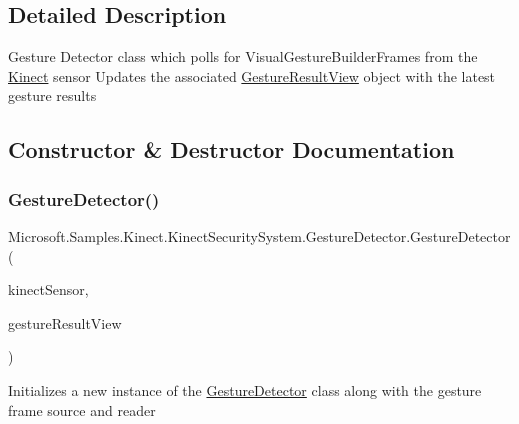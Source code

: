 \subsection{Detailed Description}
Gesture Detector class which polls for Visual\+Gesture\+Builder\+Frames from the \hyperlink{namespace_microsoft_1_1_samples_1_1_kinect}{Kinect} sensor Updates the associated \hyperlink{class_microsoft_1_1_samples_1_1_kinect_1_1_kinect_security_system_1_1_gesture_result_view}{Gesture\+Result\+View} object with the latest gesture results 



\subsection{Constructor \& Destructor Documentation}
\mbox{\label{class_microsoft_1_1_samples_1_1_kinect_1_1_kinect_security_system_1_1_gesture_detector_ac072ff2ebd85a754b9b1b4e925757d8a}} 
\subsubsection{\texorpdfstring{Gesture\+Detector()}{GestureDetector()}}
{\footnotesize\ttfamily Microsoft.\+Samples.\+Kinect.\+Kinect\+Security\+System.\+Gesture\+Detector.\+Gesture\+Detector (\begin{DoxyParamCaption}\item[{Kinect\+Sensor}]{kinect\+Sensor,  }\item[{\hyperlink{class_microsoft_1_1_samples_1_1_kinect_1_1_kinect_security_system_1_1_gesture_result_view}{Gesture\+Result\+View}}]{gesture\+Result\+View }\end{DoxyParamCaption})}



Initializes a new instance of the \hyperlink{class_microsoft_1_1_samples_1_1_kinect_1_1_kinect_security_system_1_1_gesture_detector}{Gesture\+Detector} class along with the gesture frame source and reader 


